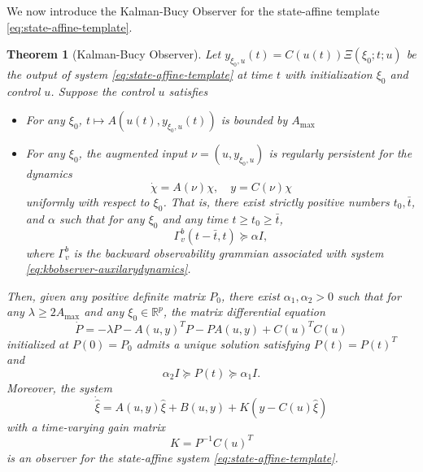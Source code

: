 \documentclass[
]{book}
\newtheorem{theorem}{Theorem}[chapter]
\theoremstyle{definition}
\theoremstyle{definition}
\theoremstyle{definition}
\theoremstyle{definition}
\theoremstyle{remark}
\begin{document}
We now introduce the Kalman-Bucy Observer for the state-affine template \eqref{eq:state-affine-template}.

\begin{theorem}[Kalman-Bucy Observer]
\protect\hypertarget{thm:kalmanbucystateaffine}{}\label{thm:kalmanbucystateaffine}Let \(y_{\xi_0,u}(t) = C(u(t)) \Xi (\xi_0;t;u)\) be the output of system \eqref{eq:state-affine-template} at time \(t\) with initialization \(\xi_0\) and control \(u\). Suppose the control \(u\) satisfies

\begin{itemize}
\item
  For any \(\xi_0\), \(t \mapsto A(u(t),y_{\xi_0,u}(t))\) is bounded by \(A_{\max}\)
\item
  For any \(\xi_0\), the augmented input \(\nu = (u,y_{\xi_0,u})\) is \emph{regularly persistent} for the dynamics
  \begin{equation}
  \dot{\chi} = A(\nu) \chi , \quad y = C(\nu) \chi 
  \label{eq:kbobserver-auxilarydynamics}
  \end{equation}
  uniformly with respect to \(\xi_0\). That is, there exist strictly positive numbers \(t_0,\bar{t}\), and \(\alpha\) such that for any \(\xi_0\) and any time \(t \geq t_0 \geq \bar{t}\),
  \[
  \Gamma_v^b (t-\bar{t}, t) \succeq \alpha I,
  \]
  where \(\Gamma_v^b\) is the \emph{backward observability grammian} associated with system \eqref{eq:kbobserver-auxilarydynamics}.
\end{itemize}

Then, given any positive definite matrix \(P_0\), there exist \(\alpha_1,\alpha_2 > 0\) such that for any \(\lambda \geq 2 A_{\max}\) and any \(\xi_0 \in \mathbb{R}^p\), the matrix differential equation
\begin{equation}
\dot{P} = -\lambda P - A(u,y)^T P - P A(u,y) + C(u)^T C(u)
\label{eq:kbobserver-matrixdifferential}
\end{equation}
initialized at \(P(0) = P_0\) admits a unique solution satisfying \(P(t)=P(t)^T\) and
\[
\alpha_2 I \succeq P(t) \succeq \alpha_1 I.
\]
Moreover, the system
\begin{equation}
\dot{\hat{\xi}} = A(u,y) \hat{\xi} + B(u,y) + K (y - C(u)\hat{\xi})
\label{eq:kbobserver-observer}
\end{equation}
with a time-varying gain matrix
\begin{equation}
K = P^{-1} C(u)^T 
\label{eq:kbobserver-gain}
\end{equation}
is an observer for the state-affine system \eqref{eq:state-affine-template}.
\end{theorem}
\end{document}
